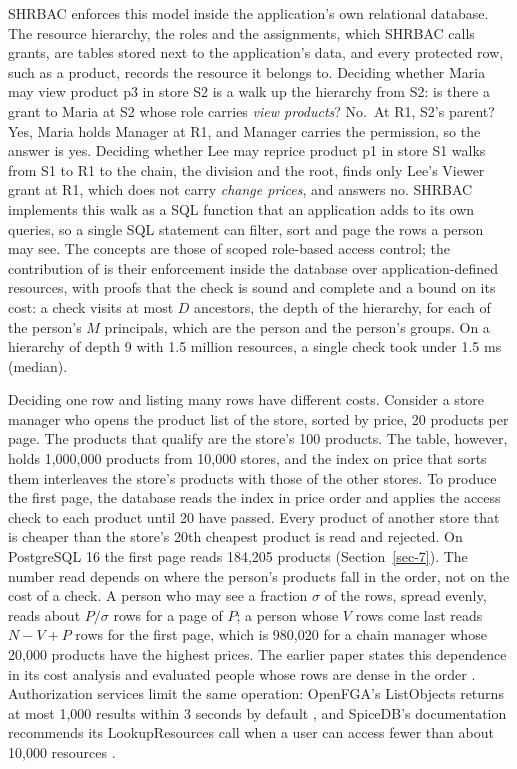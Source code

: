 \documentclass[conference]{IEEEtran}
\begin{document}
SHRBAC \cite{ref8} enforces this model inside the application's own relational database. The resource hierarchy, the roles and the assignments, which SHRBAC calls grants, are tables stored next to the application's data, and every protected row, such as a product, records the resource it belongs to. Deciding whether Maria may view product p3 in store S2 is a walk up the hierarchy from S2: is there a grant to Maria at S2 whose role carries \emph{view products}? No.~At R1, S2's parent? Yes, Maria holds Manager at R1, and Manager carries the permission, so the answer is yes. Deciding whether Lee may reprice product p1 in store S1 walks from S1 to R1 to the chain, the division and the root, finds only Lee's Viewer grant at R1, which does not carry \emph{change prices}, and answers no. SHRBAC implements this walk as a SQL function that an application adds to its own queries, so a single SQL statement can filter, sort and page the rows a person may see. The concepts are those of scoped role-based access control; the contribution of \cite{ref8} is their enforcement inside the database over application-defined resources, with proofs that the check is sound and complete and a bound on its cost: a check visits at most \(D\) ancestors, the depth of the hierarchy, for each of the person's \(M\) principals, which are the person and the person's groups. On a hierarchy of depth 9 with 1.5 million resources, a single check took under 1.5 ms (median).

Deciding one row and listing many rows have different costs. Consider a store manager who opens the product list of the store, sorted by price, 20 products per page. The products that qualify are the store's 100 products. The table, however, holds 1,000,000 products from 10,000 stores, and the index on price that sorts them interleaves the store's products with those of the other stores. To produce the first page, the database reads the index in price order and applies the access check to each product until 20 have passed. Every product of another store that is cheaper than the store's 20th cheapest product is read and rejected. On PostgreSQL 16 the first page reads 184,205 products (Section~\ref{sec-7}). The number read depends on where the person's products fall in the order, not on the cost of a check. A person who may see a fraction \(\sigma\) of the rows, spread evenly, reads about \(P/\sigma\) rows for a page of \(P\); a person whose \(V\) rows come last reads \(N - V + P\) rows for the first page, which is 980,020 for a chain manager whose 20,000 products have the highest prices. The earlier paper states this dependence in its cost analysis and evaluated people whose rows are dense in the order \cite{ref8}. Authorization services limit the same operation: OpenFGA's ListObjects returns at most 1,000 results within 3 seconds by default \cite{ref9}, and SpiceDB's documentation recommends its LookupResources call when a user can access fewer than about 10,000 resources \cite{ref10}.
\end{document}
